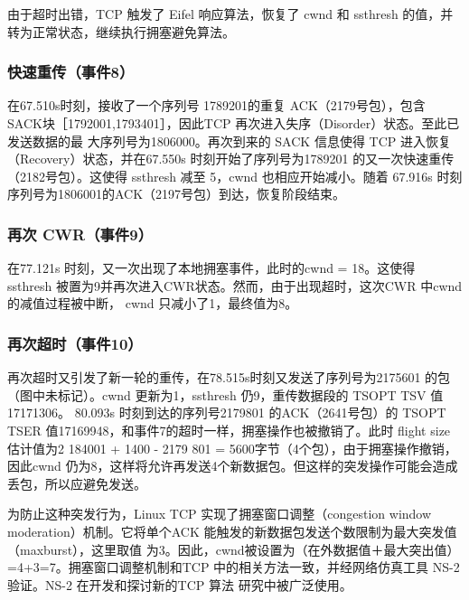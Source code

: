 由于超时出错，TCP 触发了 Eifel 响应算法，恢复了 cwnd 和 ssthresh 的值，并转为正常状态，继续执行拥塞避免算法。

\subsubsection{快速重传（事件8）}
在67.510s时刻，接收了一个序列号 1789201的重复 ACK（2179号包），包含 SACK块［1792001,1793401］，因此TCP 再次进入失序（Disorder）状态。至此已发送数据的最
大序列号为1806000。再次到来的 SACK 信息使得 TCP 进入恢复（Recovery）状态，并在67.550s 时刻开始了序列号为1789201 的又一次快速重传（2182号包）。这使得 ssthresh 减至
5，cwnd 也相应开始减小。随着 67.916s 时刻序列号为1806001的ACK（2197号包）到达，恢复阶段结束。

\subsubsection{再次 CWR（事件9）}
在77.121s 时刻，又一次出现了本地拥塞事件，此时的cwnd = 18。这使得 ssthresh 被置为9并再次进入CWR状态。然而，由于出现超时，这次CWR 中cwnd 的减值过程被中断，
cwnd 只减小了1，最终值为8。

\subsubsection{再次超时（事件10）}
再次超时又引发了新一轮的重传，在78.515s时刻又发送了序列号为2175601 的包（图中未标记）。cwnd 更新为1，ssthresh 仍9，重传数据段的 TSOPT TSV 值17171306。
80.093s 时刻到达的序列号2179801 的ACK（2641号包）的 TSOPT TSER 值17169948，和事件7的超时一样，拥塞操作也被撤销了。此时 flight size 估计值为2 184001 + 1400 -
2179 801 = 5600字节（4个包），由于拥塞操作撤销，因此cwnd 仍为8，这样将允许再发送4个新数据包。但这样的突发操作可能会造成丢包，所以应避免发送。

为防止这种突发行为，Linux TCP 实现了拥塞窗口调整（congestion window moderation）机制。它将单个ACK 能触发的新数据包发送个数限制为最大突发值（maxburst），这里取值
为3。因此，cwnd被设置为（在外数据值＋最大突出值）=4+3=7。拥塞窗口调整机制和TCP 中的相关方法一致，并经网络仿真工具 NS-2验证。NS-2 在开发和探讨新的TCP 算法
研究中被广泛使用。

